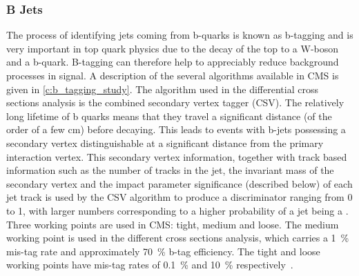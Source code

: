 \subsubsection{B Jets}
\label{sss:b_jets}
The process of identifying jets coming from b-quarks is known as b-tagging and is very important in top quark
physics due to the decay of the top to a W-boson and a b-quark. B-tagging can therefore help to appreciably
reduce background processes in signal. A description of the several algorithms available in CMS is given in
\ref{c:b_tagging_study}. The algorithm used in the differential cross sections analysis is the combined
secondary vertex tagger (CSV). The relatively long lifetime of b quarks means that they travel a significant
distance (of the order of a few cm) before decaying. This leads to events with b-jets possessing a secondary
vertex distinguishable at a significant distance from the primary interaction vertex. This secondary vertex
information, together with track based information such as the number of tracks in the jet, the invariant mass
of the secondary vertex and the impact parameter significance (described below) of each jet track is used by
the CSV algorithm to produce a discriminator ranging from 0 to 1, with larger numbers corresponding to a
higher probability of a jet being a \bjet. Three \btagging working points are used in CMS: tight, medium and
loose. The medium working point is used in the different cross sections analysis, which carries a 1~\% mis-tag
rate and approximately 70~\% b-tag efficiency. The tight and loose working points have mis-tag rates of 0.1~\% and
10~\% respectively~\cite{Chatrchyan:2012jua}.

